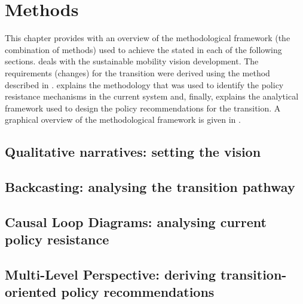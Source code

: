 \chapter{Methods}
\label{c:methods}

This chapter provides with an overview of the methodological framework (the combination of methods) used to achieve the stated  in each of the following sections.  deals with the sustainable mobility vision development. The requirements (changes) for the transition were derived using the method described in .  explains the methodology that was used to identify the policy resistance mechanisms in the current system and, finally,  explains the analytical framework used to design the policy recommendations for the transition. A graphical overview of the methodological framework is given in .

\section[Qualitative narratives]{Qualitative narratives: setting the vision}
\label{s:methods:vision}


\section[Backcasting]{Backcasting: analysing the transition pathway}
\label{s:methods:backcasting}


\section[Causal Loop Diagrams]{Causal Loop Diagrams: analysing current policy resistance}
\label{s:methods:clds}


\section[Multi-Level Perspective]{Multi-Level Perspective: deriving transition-oriented policy recommendations}
\label{s:methods:mlp-policies}
